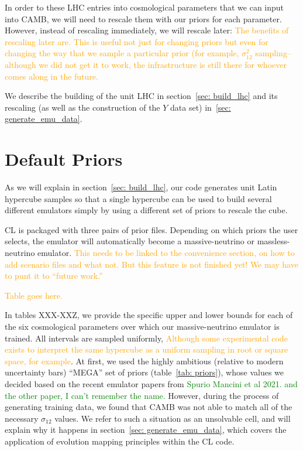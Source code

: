 In order to these LHC entries into cosmological parameters that we can input 
into CAMB, we will need to rescale them with our priors for each parameter.
However, instead of rescaling immediately, we will rescale later: 
\textcolor{orange}{The benefits of rescaling later are. This is useful not
just for changing priors but even for changing the way that we sample a
particular prior (for example, $\sigma_{12}^2$ sampling--although we did not
get it to work, the infrastructure is still there for whoever comes along in
the future.}
 
We describe the building of the unit LHC in section~\ref{sec: build_lhc}
and its rescaling (as well as the construction of the $Y$ data set) 
in~\ref{sec: generate_emu_data}.


\section{Default Priors}
\label{sec: default_priors}


As we will explain in section~\ref{sec: build_lhc}, our code generates unit 
Latin hypercube samples so that a single hypercube can be used to build 
several different emulators simply by using a different set of priors to 
rescale the cube.

CL is packaged with three pairs of prior files. Depending on which priors the 
user selects, the emulator will automatically become a massive-neutrino or 
massless-neutrino emulator. \textcolor{orange}{This needs to be linked to the 
convenience section, on how to add scenario files and what not. But this 
feature is not finished yet! We may have to punt it to “future work.”}

\textcolor{orange}{Table goes here.}

In tables XXX-XXZ, we provide the specific upper and lower bounds for each of
the six cosmological parameters over which our massive-neutrino emulator is 
trained. All intervals are sampled uniformly, \textcolor{orange}{Although some
experimental code exists to interpret the same hypercube as a uniform sampling
in root or square space, for example}. At first, we used the highly ambitious 
(relative to modern uncertainty bars) ``MEGA'' set of priors
(table~\ref{tab: priors}),
whose values we decided based on the recent emulator papers from
\textcolor{green}{Spurio Mancini et al 2021. and the other paper, I can't
remember the name.} However, during the process of generating training data, 
we found that CAMB was not able to match all of the necessary $\sigma_{12}$ 
values. We refer to such a situation as an unsolvable cell, and will explain
why it happens in section~\ref{sec: generate_emu_data}, which covers the
application of evolution mapping principles within the CL code.

